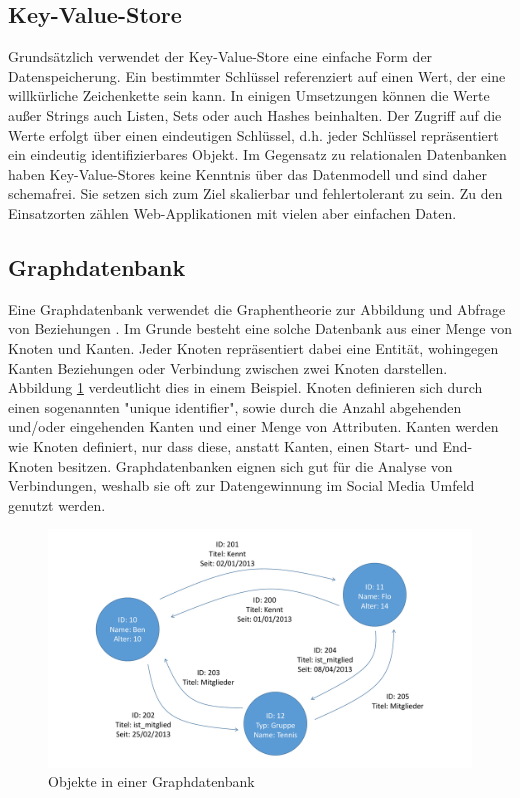 \subsection{Key-Value-Store}
\label{ch:grundlagen:sec:NoSQL:KeyValueStore}

Grundsätzlich verwendet der Key-Value-Store eine einfache Form der Datenspeicherung. Ein bestimmter Schlüssel referenziert auf einen Wert, der eine willkürliche Zeichenkette sein kann. In einigen Umsetzungen können die Werte außer Strings auch Listen, Sets oder auch Hashes beinhalten. Der Zugriff auf die Werte erfolgt über einen eindeutigen Schlüssel, d.h. jeder Schlüssel repräsentiert ein eindeutig identifizierbares Objekt. Im Gegensatz zu relationalen Datenbanken haben Key-Value-Stores keine Kenntnis über das Datenmodell und sind daher schemafrei. Sie setzen sich zum Ziel skalierbar und fehlertolerant zu sein. Zu den Einsatzorten zählen Web-Applikationen mit vielen aber einfachen Daten.

\subsection{Graphdatenbank}
\label{ch:grundlagen:sec:NoSQL:GraphDatenbanken}

Eine Graphdatenbank verwendet die Graphentheorie zur Abbildung und Abfrage von Beziehungen \cite{SWB-386976589}. Im Grunde besteht eine solche Datenbank aus einer Menge von Knoten und Kanten. Jeder Knoten repräsentiert dabei eine Entität, wohingegen Kanten Beziehungen oder Verbindung zwischen zwei Knoten darstellen. Abbildung \ref{graph_database} verdeutlicht dies in einem Beispiel. Knoten definieren sich durch einen sogenannten "unique identifier", sowie durch die Anzahl abgehenden und/oder eingehenden Kanten und einer Menge von Attributen. Kanten werden wie Knoten definiert, nur dass diese, anstatt Kanten, einen Start- und End-Knoten besitzen. Graphdatenbanken eignen sich gut für die Analyse von Verbindungen, weshalb sie oft zur Datengewinnung im Social Media Umfeld genutzt werden.

\begin{figure}[htbp]
	\centering
  \includegraphics[width=1.0\textwidth, width=1.0\textwidth]{pics/graphdatabase.pdf}
	\caption{Objekte in einer Graphdatenbank}
	\label{graph_database}
\end{figure}

